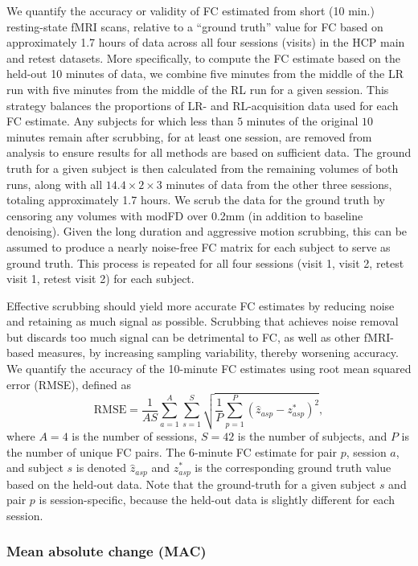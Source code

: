 \documentclass{article}
\renewcommand{\hat}{\widehat}
\begin{document}
We quantify the accuracy or validity of FC estimated from short (10 min.) resting-state fMRI scans, relative to a ``ground truth'' value for FC based on approximately 1.7 hours of data across all four sessions (visits) in the HCP main and retest datasets. More specifically, to compute the FC estimate based on the held-out 10 minutes of data, we combine  five minutes from the middle of the LR run with five minutes from the middle of the RL run for a given session. This strategy balances the proportions of LR- and RL-acquisition data used for each FC estimate. Any subjects for which less than $5$ minutes of the original $10$ minutes remain after scrubbing, for at least one session, are removed from analysis to ensure results for all methods are based on sufficient data. The ground truth for a given subject is then calculated from the remaining volumes of both runs, along with all $14.4 \times 2 \times 3$ minutes of data from the other three sessions, totaling approximately 1.7 hours. We scrub the data for the ground truth by censoring any volumes with modFD over 0.2mm (in addition to baseline denoising). Given the long duration and aggressive motion scrubbing, this can be assumed to produce a nearly noise-free FC matrix for each subject to serve as ground truth. This process is repeated for all four sessions (visit 1, visit 2, retest visit 1, retest visit 2) for each subject. 

Effective scrubbing should yield more accurate FC estimates by reducing noise and retaining as much signal as possible. Scrubbing that achieves noise removal but discards too much signal can be detrimental to FC, as well as other fMRI-based measures, by increasing sampling variability, thereby worsening accuracy. We quantify the accuracy of the 10-minute FC estimates using root mean squared error (RMSE), defined as
$$
\textrm{RMSE}=
\frac{1}{AS}\sum^{A}_{a=1}\sum^{S}_{s=1}\sqrt{\frac{1}{P}\sum^{P}_{p=1}{\left(\hat{z}_{asp}-z^*_{asp}\right)^2}},
$$
where $A=4$ is the number of sessions, $S=42$ is the number of subjects, and  $P$ is the number of unique FC pairs. The 6-minute FC estimate for pair $p$, session $a$, and subject $s$ is denoted $\hat{z}_{asp}$ and ${z^*_{asp}}$ is the corresponding ground truth value based on the held-out data. Note that the ground-truth for a given subject $s$ and pair $p$ is session-specific, because the held-out data is slightly different for each session.

\subsubsection{Mean absolute change (MAC)}
\end{document}
